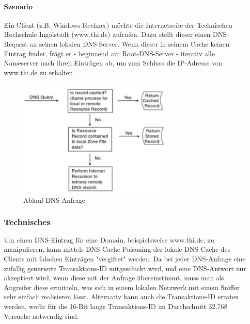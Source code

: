 \paragraph*{Szenario}
Ein Client (z.B. Windows-Rechner) möchte die Internetseite der Technischen Hochschule Ingolstadt (www.thi.de) aufrufen. Dazu stellt dieser einen DNS-Request an seinen lokalen DNS-Server.
Wenn dieser in seinem Cache keinen Eintrag findet, frägt er - beginnend am Root-DNS-Server - iterativ alle Nameserver nach ihren Einträgen ab, um zum Schluss die IP-Adresse von www.thi.de
zu erhalten.\\
\begin{figure}[h!]
	\centering
	\includegraphics[width=0.7\textwidth]{bilder/DNS-Request.pdf}
	\caption{Ablauf DNS-Anfrage \cite{young2003hacker}}
	\label{fig:dnsrequest}
\end{figure}

\subsubsection*{Technisches}
Um einen DNS-Eintrag für eine Domain, beispielsweise www.thi.de, zu manipulieren, kann mittels DNS Cache Poisoning der lokale DNS-Cache des Clients mit falschen Einträgen "vergiftet" werden.
Da bei jeder DNS-Anfrage eine zufällig generierte Transaktions-ID mitgeschickt wird, und eine DNS-Antwort nur akzeptiert wird, wenn diese mit der Anfrage übereinstimmt, muss man als Angreifer diese ermitteln, was sich in einem lokalen Netzwerk mit einem Sniffer sehr einfach realisieren lässt. Alternativ kann auch die Transaktions-ID erraten werden, wofür für die 16-Bit lange Transaktions-ID im Durchschnitt 32.768 Versuche notwendig sind.

